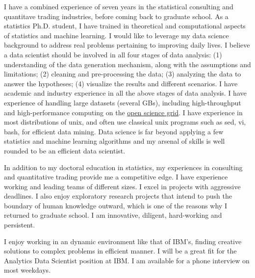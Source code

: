 \documentclass{letter} %
\begin{document}
\begin{letter}
\noindent %
I have a combined experience of seven years in the statistical consulting and quantitave trading industries, before coming back to graduate school. As a statistics Ph.D. student, I have trained in theoretical and computational aspects of statistics and machine learning. I would like to leverage my data science background to address real problems pertaining to improving daily lives. I believe a data scientist should be involved in all four stages of data analysis: (1) understanding of the data generation mechanism, along with the assumptions and limitations; (2) cleaning and pre-processing the data; (3) analyzing the data to answer the hypotheses; (4) visualize the results and different scenarios. I have academic and industry experience in all the above stages of data analysis. I have experience of handling large datasets (several GBs), including high-throughput and high-performance computing on the \href{http://www.opensciencegrid.org/}{open science grid}. I have experience in most distributions of unix, and often use classical unix programs such as sed, vi, bash, for efficient data mining. Data science is far beyond applying a few statistics and machine learning algorithms and my arsenal of skills is well rounded to be an efficient data scientist. 

In addition to my doctoral education in statistics, my experiences in consulting and quantitative trading provide me a competitive edge. I have experience working and leading teams of different sizes. I excel in projects with aggressive deadlines. I also enjoy exploratory research projects that intend to push the boundary of human knowledge outward, which is one of the reasons why I returned to graduate school. I am innovative, diligent, hard-working and persistent. 

\noindent %
I enjoy working in an dynamic environment like that of IBM's, finding creative solutions to complex problems in efficient manner. I will be a great fit for the Analytics Data Scientist position at IBM. I am available for a phone interview on most weekdays. 


\end{letter}
\end{document}

